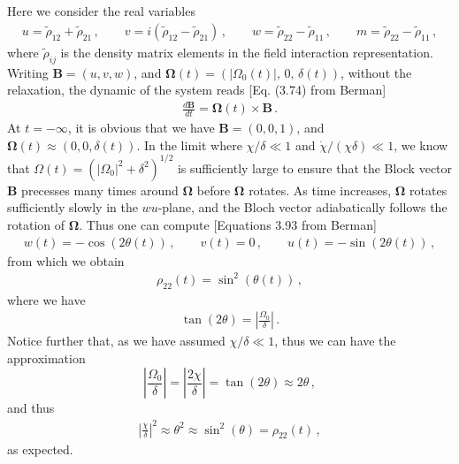 \documentclass[11pt, oneside]{book}
\theoremstyle{break}
\theoremstyle{break}
\newcommand{\that}[1]{\widetilde{#1}}
\begin{document}
\chapter{}
Here we consider the real variables
\begin{align*}
u = \that{\rho}_{12} + \that{\rho}_{21}\,,\qquad
v = i(\that{\rho}_{12}- \that{\rho}_{21})\,,\qquad
w = \that{\rho}_{22} -\that{\rho}_{11}\,,\qquad
m = \that{\rho}_{22} - \that{\rho}_{11}\,, 
\end{align*}
where $\that{\rho}_{ij}$ is the density matrix elements in the field interaction representation. Writing $\mathbf{B} = (u,v,w)$, and $\mathbf{\Omega}(t) = (|\Omega_0 (t)|,\, 0,\, \delta(t))$, without the relaxation, the dynamic of the system reads [Eq. (3.74) from Berman]
\begin{align*}
\frac{d\mathbf{B}}{dt} = \mathbf{\Omega}(t) \times \mathbf{B}\,.
\end{align*}
At $t = -\infty$, it is obvious that we have $\mathbf{B} = (0,0,1)$, and $\mathbf{\Omega}(t) \approx (0,0, \delta(t))$. In the limit where $\chi/\delta \ll 1$ and $\dot{\chi}/(\chi \delta)\ll 1$, we know that $\Omega(t) = (|\Omega_0|^2 + \delta^2)^{1/2}$ is sufficiently large to ensure that the Block vector $\mathbf{B}$ precesses many times around $\mathbf{\Omega}$ before $\mathbf{\Omega}$ rotates. As time increases, $\mathbf{\Omega}$ rotates sufficiently slowly in the $wu$-plane, and the Bloch vector adiabatically follows the rotation of $\mathbf{\Omega}$. Thus one can compute 
[Equations 3.93 from Berman]
\begin{align*}
w(t) = -\cos(2\theta(t)) \,,\qquad
v(t) = 0 \,,\qquad
u(t) = -\sin(2\theta(t))\,,
\end{align*} 
from which we obtain
\begin{align*}
\rho_{22}(t) = \sin^2(\theta(t))\,,
\end{align*}
where we have
\begin{align*}
\tan(2\theta) = \left|\frac{\Omega_0}{\delta}\right|\,.
\end{align*}
Notice further that, as we have assumed $\chi/\delta \ll 1$, thus we can have the approximation
$$\left|\frac{\Omega_0}{\delta}\right|= \left|\frac{2\chi}{\delta}\right| = \tan(2\theta)   \approx 2\theta\,, $$ 
and thus
\begin{align*}
\left|\frac{\chi}{\delta}\right|^2 \approx \theta^2 \approx \sin^2(\theta) = \rho_{22}(t)\,,
\end{align*}
as expected. 


\chapter{}
\end{document}
